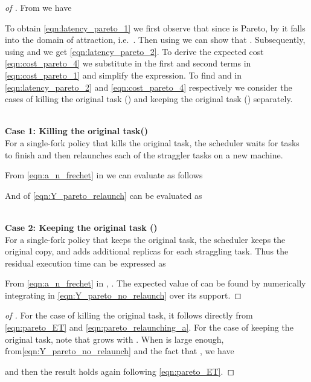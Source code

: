 \begin{proof}[of ]
From  we have

To obtain \eqref{eqn:latency_pareto_1} we first observe that since  is Pareto, by
 it falls into the \Frechet{} domain of attraction, i.e.\ . Then using  we can show that . Subsequently, using
 and  we get \eqref{eqn:latency_pareto_2}. To derive the expected cost
\eqref{eqn:cost_pareto_4} we substitute  in the first and second terms in
\eqref{eqn:cost_pareto_1} and simplify the expression.
To find  and  in \eqref{eqn:latency_pareto_2} and \eqref{eqn:cost_pareto_4} respectively we
consider the cases of killing the original task () and keeping the original task
() separately. 

~\\
\textbf{Case 1: Killing the original task()} \\
For a single-fork policy that kills the original task, the scheduler waits for  tasks to finish and then relaunches each of the  straggler tasks on a new machine. 

From \eqref{eqn:a_n_frechet} in  we can evaluate  as follows

And  of \eqref{eqn:Y_pareto_relaunch} can be evaluated as


~\\
\textbf{Case 2: Keeping the original task ()} \\
For a single-fork policy that keeps the original task, the scheduler keeps the original copy, and adds 
additional replicas for each straggling task. Thus the residual execution time can be expressed as

From \eqref{eqn:a_n_frechet} in , . The expected value of  can be found by numerically integrating  in \eqref{eqn:Y_pareto_no_relaunch} over its support. 
\end{proof}

\begin{proof}[of ]
For the case of killing the original task, it follows directly from \eqref{eqn:pareto_ET} and
\eqref{eqn:pareto_relaunching_a}. For the case of keeping the original task, note that  grows with . When  is large enough, from\eqref{eqn:Y_pareto_no_relaunch} and the fact that , we have

and then the result holds again following \eqref{eqn:pareto_ET}.
\end{proof}







